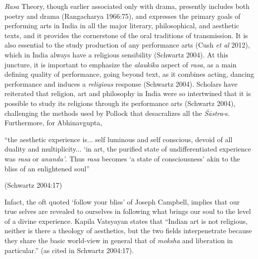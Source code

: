 \textsl{Rasa} Theory, though earlier associated only with drama, presently includes both poetry and drama (Rangacharya 1966:75), and expresses the primary goals of performing arts in India in all the major literary, philosophical, and aesthetic texts, and it provides the cornerstone of the oral traditions of transmission. It is also essential to the study production of any performance arts (Cush \textsl{et al} 2012), which in India always have a religious sensibility (Schwartz 2004). At this juncture, it is important to emphasize the \textsl{alaukika} aspect of \textsl{rasa}, as a main defining quality of performance, going beyond text, as it combines acting, dancing performance and induces a \textsl{religious} response (Schwartz 2004). Scholars have reiterated that religion, art and philosophy in India were so intertwined that it is possible to study its religions through its performance arts (Schwartz 2004), challenging the methods used by Pollock that desacralizes all the \textsl{Śāstra}-s. Furthermore, for Abhinavgupta, 

\begin{myquote}
“the aesthetic experience is... self luminous and self conscious, devoid of all duality and multiplicity... ‘in art, the purified state of undifferentiated experience was \textsl{rasa} or \textsl{ananda’}. Thus \textsl{rasa} becomes ‘a state of consciousness’ akin to the bliss of an enlightened soul” 

\hfill (Schwartz 2004:17)
\end{myquote}


Infact, the oft quoted ‘follow your bliss’ of Joseph Campbell, implies that our true selves are revealed to ourselves in following what brings our soul to the level of a divine experience. Kapila Vatsyayan states that “Indian art is not religious, neither is there a theology of aesthetics, but the two fields interpenetrate because they share the basic world-view in general that of \textsl{moksha} and liberation in particular.'' (as cited in Schwartz 2004:17). 

